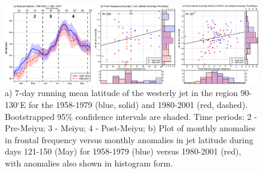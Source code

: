 \documentclass[draft,grl]{AGUTeX}
\begin{document}
\begin{figure}[htbp]
\begin{center}
\includegraphics[width=42pc]{Figures/jet}
\caption{a) 7-day running mean latitude of the westerly jet in the region 90-130$^\circ$E for the 1958-1979 (blue, solid) and 1980-2001 (red, dashed). Bootstrapped 95\% confidence intervals are shaded. Time periods: 2 - Pre-Meiyu; 3 - Meiyu; 4 - Post-Meiyu; b) Plot of monthly anomalies in frontal frequency versus monthly anomalies in jet latitude during days 121-150 (May) for 1958-1979 (blue) versus 1980-2001 (red), with anomalies also shown in histogram form.}
\label{jet_seasonal}
\end{center}
\end{figure}
\end{document}
